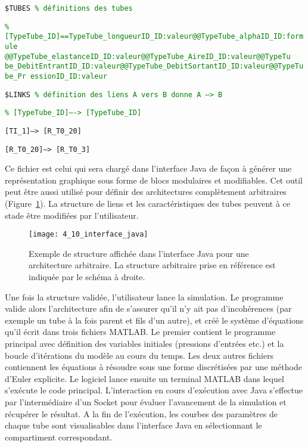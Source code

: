 \vspace{0.4cm}
{\tt \$TUBES \textcolor{green}{\% définitions des tubes}}

{\tt \textcolor{green}{\% [TypeTube\_ID]==TypeTube\_longueurID\_ID:valeur@@TypeTube\_alphaID\_ID:formule
@@TypeTube\_elastanceID\_ID:valeur@@TypeTube\_AireID\_ID:valeur@@TypeTu
be\_DebitEntrantID\_ID:valeur@@TypeTube\_DebitSortantID\_ID:valeur@@TypeTube\_Pr
essionID\_ID:valeur}}

{\tt \$LINKS \textcolor{green}{\% définition des liens A vers B donne A --> B}}

{\tt \textcolor{green}{\% [TypeTube\_ID]—-> [TypeTube\_ID]}}

{\tt [TI\_1]--> [R\_T0\_20]}

{\tt [R\_T0\_20]--> [R\_T0\_3]}

\vspace{0.4cm}
Ce fichier est celui qui sera chargé dans l’interface Java de façon à générer une représentation
graphique sous forme de blocs modulaires et modifiables. Cet outil peut être aussi utilisé pour définir
des architectures complètement arbitraires (Figure~\ref{fig:4_10_interface_java}). La structure de liens et les caractéristiques des
tubes peuvent à ce stade être modifiées par l’utilisateur.\\
\begin{figure}[!t]
\centering
\texttt{[image: 4\_10\_interface\_java]}
\caption{Exemple de structure affichée dans l'interface Java pour une architecture arbitraire. La structure arbitraire prise
en référence est indiquée par le schéma à droite.}
\label{fig:4_10_interface_java}	
\end{figure}
Une fois la structure validée, l’utilisateur lance la simulation. Le programme valide alors
l’architecture afin de s’assurer qu’il n’y ait pas d’incohérences (par exemple un tube à la fois parent et
fils d’un autre), et créé le système d’équations qu’il écrit dans trois fichiers MATLAB. Le premier
contient le programme principal avec définition des variables initiales (pressions d’entrées etc.) et la
boucle d’itérations du modèle au cours du temps. Les deux autres fichiers contiennent les équations à
résoudre sous une forme discrétisées par une méthode d’Euler explicite. Le logiciel lance ensuite un
terminal MATLAB dans lequel s’exécute le code principal. L’interaction en cours d’exécution avec Java
s’effectue par l’intermédiaire d’un Socket pour évaluer l’avancement de la simulation et récupérer le
résultat. A la fin de l’exécution, les courbes des paramètres de chaque tube sont visualisables dans
l’interface Java en sélectionnant le compartiment correspondant.\\
